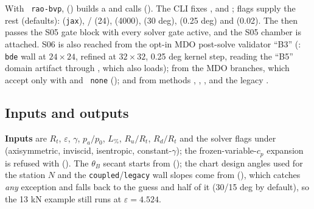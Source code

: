 With ~\texttt{rao-bvp},  () builds a
 and calls  (). The CLI
fixes ,  and ; flags supply the
rest (defaults):  (\texttt{jax}), / (24), 
(4000),  (30 deg),  (0.25 deg) and
 (0.02). The  then passes the S05 gate block with every solver
gate active, and the S05 chamber is attached. S06 is also reached from the opt-in MDO post-solve validator
``B3'' (: \texttt{bde} wall at $24\times24$, refined at $32\times32$, 0.25 deg
kernel step, reading the ``B5'' domain artifact through , which
 also loads); from the MDO branches, which accept  only with
 and ~\texttt{none} (); and from 
methods , , ,  and the legacy
.

\subsection{Inputs and outputs}

\textbf{Inputs} are $R_t$, $\varepsilon$, $\gamma$, $p_a/p_0$, $L_\%$, $R_u/R_t$, $R_d/R_t$ and the solver flags under
 (axisymmetric, inviscid, isentropic, constant-$\gamma$); the frozen-variable-$c_p$
expansion is refused with  (). The $\theta_B$ secant starts from
 (); the chart design angles used for the station $N$ and the
\texttt{coupled}/\texttt{legacy} wall slopes come from  (), which catches
\emph{any}  exception and falls back to the guess and half of it (30/15 deg by default), so the
13 kN  example still runs at $\varepsilon = 4.524$.

